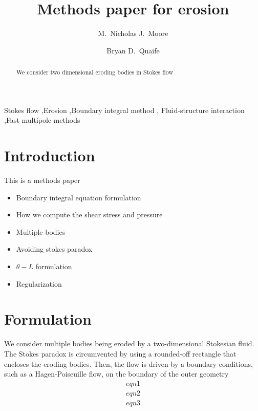 \documentclass[preprint, 10pt]{elsarticle}
\begin{document}
\title{Methods paper for erosion}

\author[Nick]{M.~Nicholas J.~Moore}
\author[Bryan]{Bryan D.~Quaife}
\address[Nick]{Department of Mathematics and Geophysical Fluid Dynamics Institute, Florida State University, Tallahassee, FL, 32306.}
\address[Bryan]{Department of Scientific Computing and Geophysical Fluid Dynamics Institute, Florida State University, Tallahassee, FL, 32306.}

\begin{abstract} 
We consider two dimensional eroding bodies in Stokes flow
\end{abstract}

\begin{keyword}
  Stokes flow \sep Erosion \sep Boundary integral method \sep
  Fluid-structure interaction \sep Fast multipole methods 
\end{keyword}

\maketitle

\section{Introduction\label{s:intro}}

This is a methods paper
\begin{itemize}
  \item Boundary integral equation formulation
  \item How we compute the shear stress and pressure
  \item Multiple bodies
  \item Avoiding stokes paradox
  \item $\theta-L$ formulation
  \item Regularization
\end{itemize}

\cite{moo-ris-chi-zha-she2013}



\section{Formulation\label{s:formulation}} 
We consider multiple bodies being eroded by a two-dimensional Stokesian
fluid.  The Stokes paradox is circumvented by using a rounded-off
rectangle that encloses the eroding bodies.  Then, the flow is driven
by a boundary conditions, such as a Hagen-Poiseuille flow, on the
boundary of the outer geometry 
\begin{subequations}
\label{eqn:erosionModel}
\begin{gather}
eqn1 \label{eqn:eqn1} \\
eqn2 \label{eqn:eqn2} \\
eqn3 \label{eqn:eqn3}
\end{gather}
\end{subequations}
\end{document}
